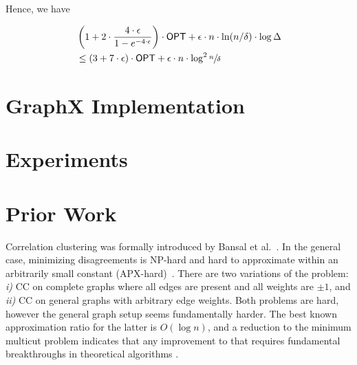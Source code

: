 \documentclass{article} %
\newcommand{\OPT}{\mathsf{OPT}}
\begin{document}
Hence, we have 

\begin{align*}
&\left(1+2\cdot \frac{4\cdot \epsilon }{1-e^{-4\cdot \epsilon}}\right)\cdot \OPT+\epsilon\cdot n\cdot \ln(n/\delta)\cdot \log\Delta \\
&\le \left(3+7\cdot\epsilon\right)\cdot \OPT+\epsilon\cdot n\cdot \log^2\sfrac{n}{\delta}
\end{align*}


%



%
%

\section{GraphX Implementation}

\section{Experiments}

\section{Prior Work}
Correlation clustering was formally introduced by Bansal et al.~\cite{bansal2002correlation}.
In the general case, minimizing disagreements is NP-hard and hard to approximate within an arbitrarily small constant (APX-hard)~\cite{bansal2002correlation,charikar2003clustering}.
There are two variations of the problem: 
{\it i)} CC on complete graphs where all edges are present and all weights are $\pm1$, and 
{\it ii)} CC on general graphs with arbitrary edge weights. %
Both problems are hard, however the general graph setup seems fundamentally harder.
The best known approximation ratio for the latter is $O(\log n)$, and a reduction to the minimum multicut problem indicates that any improvement to that requires fundamental breakthroughs in theoretical algorithms \cite{demaine2006correlation}.
\end{document}
